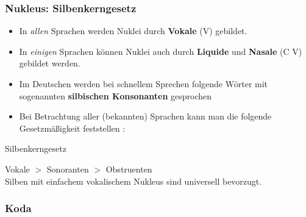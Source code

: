 \begin{frame}
\frametitle{Nukleus: Silbenkerngesetz}

\begin{itemize}

	\item In \emph{allen} Sprachen werden Nuklei durch \textbf{Vokale} (V) gebildet.
	
	\item In \emph{einigen} Sprachen können Nuklei auch durch \textbf{Liquide} und \textbf{Nasale} (C \vs V) gebildet werden.

	\item Im Deutschen werden bei schnellem Sprechen folgende Wörter mit sogenannten \textbf{silbischen Konsonanten} gesprochen
	
	\begin{multicols}{2}
          \ea
           
          \z
          
          \ea
           
          \z
	\end{multicols}

\pause 

	\item Bei Betrachtung aller (bekannten) Sprachen kann man die folgende Gesetzmäßigkeit feststellen \citep[cf.][217f.]{Hall00a}:

\end{itemize}
	
	\begin{block}{Silbenkerngesetz}
		
	Vokale $>$ Sonoranten $>$ Obstruenten\\
	Silben mit einfachem vokalischem Nukleus sind universell bevorzugt.
	\end{block}
	
\end{frame}



\subsubsection{Koda}

